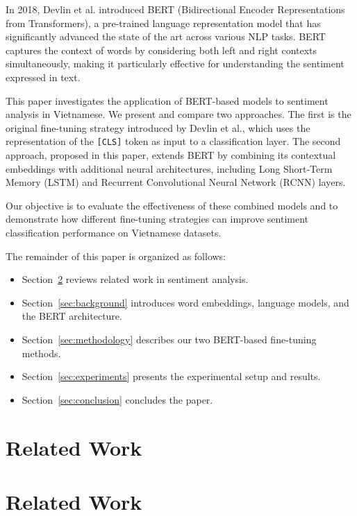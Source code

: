 \documentclass[11pt]{article}
\begin{document}
In 2018, Devlin et al. \cite{DBLP:journals/corr/abs-1810-04805} introduced BERT (Bidirectional Encoder Representations from Transformers), a pre-trained language representation model that has significantly advanced the state of the art across various NLP tasks. BERT captures the context of words by considering both left and right contexts simultaneously, making it particularly effective for understanding the sentiment expressed in text.

This paper investigates the application of BERT-based models to sentiment analysis in Vietnamese. We present and compare two approaches. The first is the original fine-tuning strategy introduced by Devlin et al., which uses the representation of the \texttt{[CLS]} token as input to a classification layer. The second approach, proposed in this paper, extends BERT by combining its contextual embeddings with additional neural architectures, including Long Short-Term Memory (LSTM) and Recurrent Convolutional Neural Network (RCNN) layers.

Our objective is to evaluate the effectiveness of these combined models and to demonstrate how different fine-tuning strategies can improve sentiment classification performance on Vietnamese datasets.

The remainder of this paper is organized as follows:  
\begin{itemize}
    \item Section~\ref{sec:related_work} reviews related work in sentiment analysis.
    \item Section~\ref{sec:background} introduces word embeddings, language models, and the BERT architecture.
    \item Section~\ref{sec:methodology} describes our two BERT-based fine-tuning methods.
    \item Section~\ref{sec:experiments} presents the experimental setup and results.
    \item Section~\ref{sec:conclusion} concludes the paper.
\end{itemize}

\section{Related Work}
\label{sec:related_work}
\section{Related Work}
\label{sec:related_work}
\end{document}
